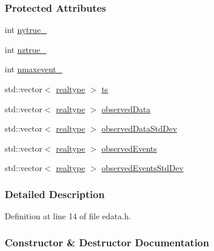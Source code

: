 \subsubsection*{Protected Attributes}
\begin{DoxyCompactItemize}
\item 
int \mbox{\hyperlink{classamici_1_1_exp_data_ad7e81d1df451bdfcc55008fa06f2f389}{nytrue\+\_\+}}
\item 
int \mbox{\hyperlink{classamici_1_1_exp_data_a8913df548ec3837f9179a5ab63b32d13}{nztrue\+\_\+}}
\item 
int \mbox{\hyperlink{classamici_1_1_exp_data_af1bb7f9e32c45f8f3c34c9c4a7e5b1ac}{nmaxevent\+\_\+}}
\item 
std\+::vector$<$ \mbox{\hyperlink{namespaceamici_a1bdce28051d6a53868f7ccbf5f2c14a3}{realtype}} $>$ \mbox{\hyperlink{classamici_1_1_exp_data_aa7014a80e7b102f85a10e3b9a480e8e5}{ts}}
\item 
std\+::vector$<$ \mbox{\hyperlink{namespaceamici_a1bdce28051d6a53868f7ccbf5f2c14a3}{realtype}} $>$ \mbox{\hyperlink{classamici_1_1_exp_data_a6acedf749a3c5e4c4dcbc822f58a565d}{observed\+Data}}
\item 
std\+::vector$<$ \mbox{\hyperlink{namespaceamici_a1bdce28051d6a53868f7ccbf5f2c14a3}{realtype}} $>$ \mbox{\hyperlink{classamici_1_1_exp_data_aa097568cebb4be48c4c1dfaab0c2a159}{observed\+Data\+Std\+Dev}}
\item 
std\+::vector$<$ \mbox{\hyperlink{namespaceamici_a1bdce28051d6a53868f7ccbf5f2c14a3}{realtype}} $>$ \mbox{\hyperlink{classamici_1_1_exp_data_a629e6085839e16bac95ef0eba580f7f0}{observed\+Events}}
\item 
std\+::vector$<$ \mbox{\hyperlink{namespaceamici_a1bdce28051d6a53868f7ccbf5f2c14a3}{realtype}} $>$ \mbox{\hyperlink{classamici_1_1_exp_data_abb12a8f75b4e6c936ae6c0be770628c9}{observed\+Events\+Std\+Dev}}
\end{DoxyCompactItemize}


\subsubsection{Detailed Description}


Definition at line 14 of file edata.\+h.



\subsubsection{Constructor \& Destructor Documentation}
\mbox{\label{classamici_1_1_exp_data_a19c9736cc55da621d8de182a76cc1e8f}} 
